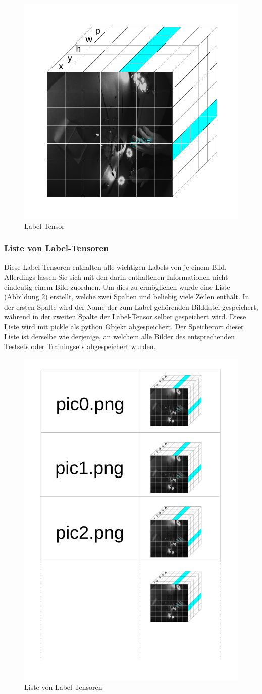\begin{figure}	
	\centering
	\includegraphics[width=.7\textwidth]{Kapitel/30DatenPipeline/Bilder/LabelTensor.pdf}
	\caption{Label-Tensor}
	\label{img:label_tensor}
\end{figure} 

\subsubsection{Liste von Label-Tensoren}
Diese Label-Tensoren enthalten alle wichtigen Labels von je einem Bild. 
Allerdings lassen Sie sich mit den darin enthaltenen Informationen nicht eindeutig einem Bild zuordnen. 
Um dies zu ermöglichen wurde eine Liste (Abbildung \ref{img:label_list}) erstellt, welche zwei Spalten und beliebig viele Zeilen enthält.
In der ersten Spalte wird der Name der zum Label gehörenden Bilddatei gespeichert, während in der zweiten Spalte der Label-Tensor selber gespeichert wird. 
Diese Liste wird mit pickle als python Objekt abgespeichert.
Der Speicherort dieser Liste ist derselbe wie derjenige, an welchem alle Bilder des entsprechenden Testsets oder Trainingsets abgespeichert wurden.

\begin{figure}	
	\centering
	\includegraphics[width=.4\textwidth]{Kapitel/30DatenPipeline/Bilder/LabelList.pdf}
	\caption{Liste von Label-Tensoren}
	\label{img:label_list}
\end{figure} 
